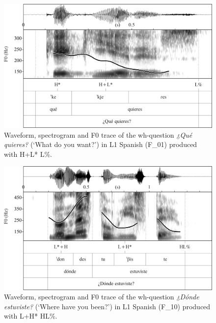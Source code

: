 \begin{figure}


\includegraphics[width=\textwidth]{figures/Figure_4.94.png}



\caption{Waveform, spectrogram and F0 trace of the wh-question \textit{¿Qué quieres?} (‘What do you want?’) in L1 Spanish (F\_01) produced with H+L* L\%.}
\label{fig:4.94}
\end{figure}

\begin{figure}


\includegraphics[width=\textwidth]{figures/Figure_4.95.png}



\caption{Waveform, spectrogram and F0 trace of the wh-question \textit{¿Dónde estuviste?} (‘Where have you been?’) in L1 Spanish (F\_10) produced with L+H* HL\%.}
\label{fig:4.95}
\end{figure}

